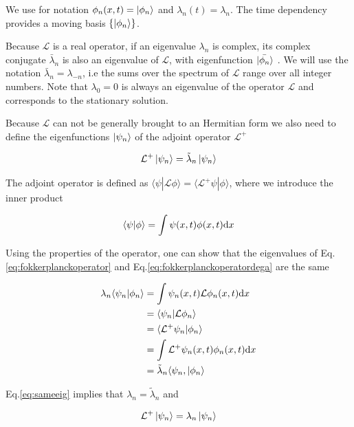 \documentclass[12pt,twoside]{report}
\def \dd  {{\rm d}}
\begin{document}
We use for notation $\phi_n(x,t)=\ket{\phi_n}$ and $\lambda_n(t)=\lambda_n$.
The time dependency provides a moving basis $\{\ket{\phi_n}\}$. 

Because $\mathcal{L}$ is a real operator, if an eigenvalue $\lambda_n$ is complex, its complex conjugate $\bar{\lambda}_n$  is also an eigenvalue of $\mathcal{L}$, with eigenfunction $\ket{\bar{\phi_n}}$ . We will use the notation $\bar{\lambda}_n=\lambda_{-n}$, i.e the sums over the spectrum of $\mathcal{L}$ range over all integer numbers. Note that $\lambda_0=0$ is always an eigenvalue of the operator $\mathcal{L}$ and corresponds to the stationary solution.

Because $\mathcal{L}$ can not be generally brought to an Hermitian form we also need to define the eigenfunctions $\ket{\psi_n}$ of the adjoint operator $\mathcal{L}^{+}$ 

\begin{equation}
\label{eq:fokkerplanckoperatordega}
\mathcal{L}^+\ket{\psi_n}=\tilde{\lambda}_n\ket{\psi_n}
\end{equation}

The adjoint operator is defined as $\langle\psi|\mathcal{L}\phi\rangle=\langle\mathcal{L}^+\psi|\phi\rangle$, where we introduce the inner product

\begin{equation}
\label{eq:innerproduct}
\langle\psi|\phi\rangle=\int\psi(x,t)\phi(x,t)\dd x
\end{equation}


Using the properties of the operator, one can show that the eigenvalues of Eq.\eqref{eq:fokkerplanckoperator} and Eq.\eqref{eq:fokkerplanckoperatordega} are the same

\begin{align}
\lambda_n\langle\psi_n|\phi_n\rangle &=\int\psi_n(x,t)\mathcal{L}\phi_n(x,t)\dd x  \nonumber \\
&=\langle\psi_n|\mathcal{L}\phi_n\rangle \nonumber \\
&=\langle\mathcal{L}^+\psi_n|\phi_n\rangle  \nonumber \\
&=\int\mathcal{L}^+\psi_n(x,t)\phi_n(x,t)\dd x \nonumber \\
&=\tilde{\lambda}_n\langle\psi_n,|\phi_n\rangle \label{eq:sameeig}
\end{align}

Eq.\eqref{eq:sameeig} implies that $\lambda_n=\tilde{\lambda}_n$ and

\begin{equation}
\label{eq:fokkerplanckoperatordega2}
\mathcal{L}^+\ket{\psi_n}=\lambda_n\ket{\psi_n}
\end{equation}
\end{document}
